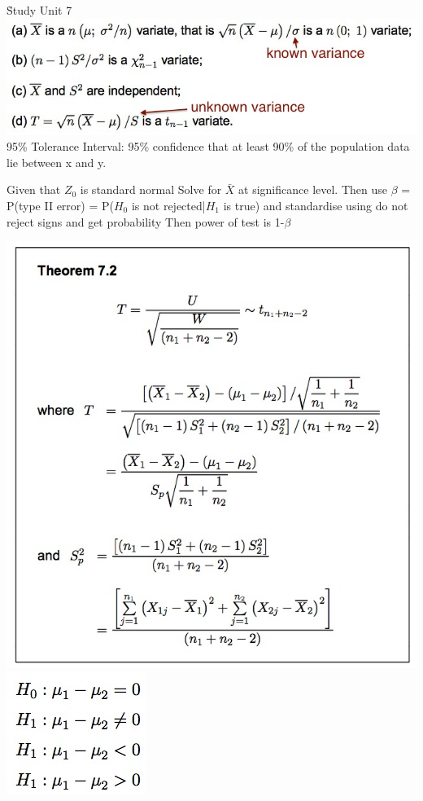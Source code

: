 \documentclass{examnotes}
\begin{document}
\h{Study Unit 7}
\includegraphics[scale=0.5]{./img/71.jpg}
95\% Tolerance Interval: 95\% confidence that at least 90\% of the population data lie between x and y.

Given that $Z_0$ is standard normal Solve for $\bar{X}$ at significance level.
Then use $\beta$ = P(type II error) =  P($H_0$ is not rejected|$H_1$ is true) 
and standardise using do not reject signs and get probability 
Then power of test is 1-$\beta$

\includegraphics[scale=0.5]{./img/72.jpg}
\includegraphics[scale=0.5]{./img/72hyp.jpg}
\end{document}
